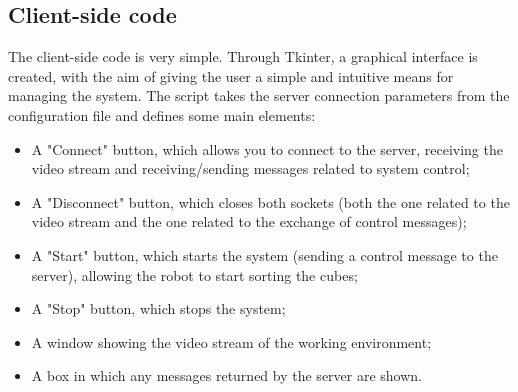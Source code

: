 \documentclass[a4paper,11pt]{report}
\theoremstyle{definition}
\theoremstyle{plain}
\begin{document}
        \subsection{Client-side code}
            The client-side code is very simple. Through Tkinter, a graphical interface is created, with the aim of giving the user a simple and intuitive means for managing the system. The script takes the server connection parameters from the configuration file and defines some main elements:
            \begin{itemize}
                \item A "Connect" button, which allows you to connect to the server, receiving the video stream and receiving/sending messages related to system control;
                \item A "Disconnect" button, which closes both sockets (both the one related to the video stream and the one related to the exchange of control messages);
                \item A "Start" button, which starts the system (sending a control message to the server), allowing the robot to start sorting the cubes;
                \item A "Stop" button, which stops the system;
                \item A window showing the video stream of the working environment;
                \item A box in which any messages returned by the server are shown.
            \end{itemize}
\end{document}
